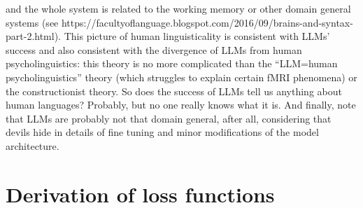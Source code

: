 \documentclass[hyperref, a4paper, 12pt]{report}
\begin{document}
and the whole system is related to the working memory or other domain general systems (see https://facultyoflanguage.blogspot.com/2016/09/brains-and-syntax-part-2.html).
This picture of human linguisticality is consistent with LLMs' success
and also consistent with the divergence of LLMs from human psycholinguistics:
this theory is no more complicated than the ``LLM=human psycholinguistics'' theory (which struggles to explain certain fMRI phenomena) or the constructionist theory.
So does the success of LLMs tell us anything about human languages?
Probably, but no one really knows what it is.
And finally, note that LLMs are probably not that domain general, after all,
considering that devils hide in details of fine tuning and minor modifications of the model architecture.

\chapter{Derivation of loss functions}
\end{document}
